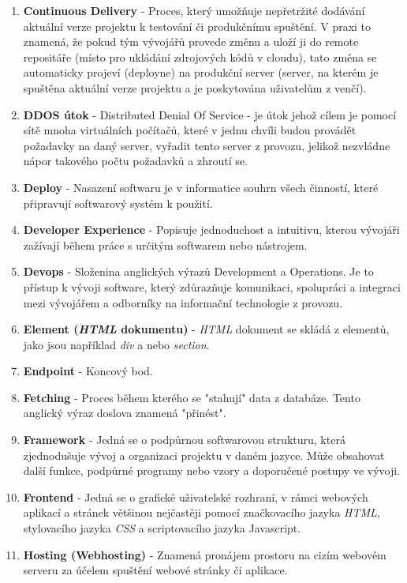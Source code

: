 \documentclass[12pt,a4paper]{report}
\begin{document}
\begin{enumerate}
    \item \textbf{Continuous Delivery} -  Proces, který umožňuje nepřetržité dodávání aktuální verze projektu k testování či produkčnímu spuštění. V praxi to znamená, že pokud tým vývojářů provede změnu a uloží ji do remote repositáře (místo pro ukládání zdrojových kódů v cloudu), tato změna se automaticky projeví (deployne) na produkční server (server, na kterém je spuštěna aktuální verze projektu a je poskytována uživatelům z venčí).
    \item \textbf{DDOS útok} - Distributed Denial Of Service - je útok jehož cílem je pomocí sítě mnoha virtuálních počítačů, které v jednu chvíli budou provádět požadavky na daný server, vyřadit tento server z provozu, jelikož nezvládne nápor takového počtu požadavků a zhroutí se.
    \item \textbf{Deploy} - Nasazení softwaru je v informatice souhrn všech činností, které připravují softwarový systém k použití.
    \item \textbf{Developer Experience} - Popisuje jednoduchost a intuitivu, kterou vývojáři zažívají během práce s určitým softwarem nebo nástrojem.
    \item \textbf{Devops} - Složenina anglických výrazů Development a Operations. Je to přístup k vývoji software, který zdůrazňuje komunikaci, spolupráci a integraci mezi vývojářem a odborníky na informační technologie z provozu. 
    \item \textbf{Element (\emph{HTML} dokumentu)} - \emph{HTML} dokument se skládá z elementů, jako jsou například \emph{div} a nebo \emph{section}.
    \item \textbf{Endpoint} - Koncový bod. 
    \item \textbf{Fetching} - Proces během kterého se "stahují" data z databáze. Tento anglický výraz doslova znamená "přinést".
    \item \textbf{Framework} - Jedná se o podpůrnou softwarovou strukturu, která zjednodušuje vývoj a organizaci projektu v daném jazyce. Může obsahovat další funkce, podpůrné programy nebo vzory a doporučené postupy ve vývoji.
    \item \textbf{Frontend} - Jedná se o grafické uživatelské rozhraní, v rámci webových aplikací a stránek většinou nejčastěji pomocí značkovacího jazyka \emph{HTML}, stylovacího jazyka \emph{CSS} a scriptovacího jazyka Javascript.
    \item \textbf{Hosting (Webhosting)} - Znamená pronájem prostoru na cizím webovém serveru za účelem spuštění webové stránky či aplikace. 

\end{enumerate}
\end{document}

